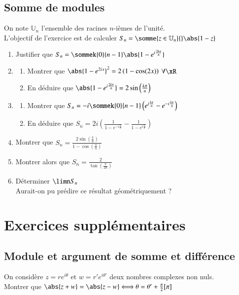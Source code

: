 \documentclass[oneside,12pt]{article}          %
\begin{document}
\subsection{Somme de modules}
On note $\mathbb{U}_n$ l'ensemble des racines $n$-ièmes de l'unité.\\
L'objectif de l'exercice est de calculer $S_n=\somme{z\in\mathbb{U}_n}{}\abs{1-z}$
\begin{enumerate}
	\item Justifier que $S_n=\sommek{0}{n-1}\abs{1-e^{i\frac{2k\pi}{n}}}$
	\item \begin{enumerate}
		\item Montrer que $\abs{1-e^{2ix}}^2=2\left(1-\cos(2x)\right)$ \quad $\forall\xR$
		\item En déduire que $\abs{1-e^{i\frac{2k\pi}{n}}}=2\sin\left(\frac{k\pi}{n}\right)$
	\end{enumerate}
	\item \begin{enumerate}
		\item Montrer que $S_n=-i\sommek{0}{n-1}\left(e^{i\frac{k\pi}{n}}-e^{-i\frac{k\pi}{n}}\right)$
		\item En déduire que $S_n=2i\left(\frac{1}{1-e^{-i\frac{\pi}{n}}}-\frac{1}{1-e^{i\frac{\pi}{n}}}\right)$
	\end{enumerate}
	\item Montrer que $S_n=\frac{2\sin\left(\frac{\pi}{n}\right)}{1-\cos\left(\frac{\pi}{n}\right)}$
	\item Montrer alors que $S_n=\frac{2}{\tan\left(\frac{\pi}{2n}\right)}$
	\item Déterminer $\limn S_n$\\
	Aurait-on pu prédire ce résultat géométriquement ?
\end{enumerate}




\section{Exercices supplémentaires}

\subsection{Module et argument de somme et différence}

On considère $z=re^{i\theta}$ et $w=r'e^{i\theta'}$ deux nombres complexes non nuls. \\
Montrer que $\abs{z+w}=\abs{z-w}\Longleftrightarrow \theta=\theta'+\frac{\pi}{2} [\pi]$
\end{document}

